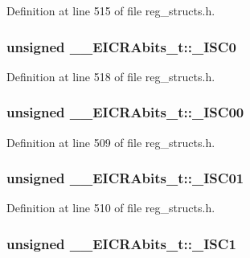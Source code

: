 Definition at line 515 of file reg\+\_\+structs.\+h.

\hypertarget{union_____e_i_c_r_abits__t_a6e8d48b85c5c1f781879076d76f566d0}{
\subsubsection[{\+\_\+\+I\+S\+C0}]{\setlength{\rightskip}{0pt plus 5cm}unsigned \+\_\+\+\_\+\+E\+I\+C\+R\+Abits\+\_\+t\+::\+\_\+\+I\+S\+C0}}\label{union_____e_i_c_r_abits__t_a6e8d48b85c5c1f781879076d76f566d0}


Definition at line 518 of file reg\+\_\+structs.\+h.

\hypertarget{union_____e_i_c_r_abits__t_a29dd9f71cf98c01f86368c683117d9e5}{
\subsubsection[{\+\_\+\+I\+S\+C00}]{\setlength{\rightskip}{0pt plus 5cm}unsigned \+\_\+\+\_\+\+E\+I\+C\+R\+Abits\+\_\+t\+::\+\_\+\+I\+S\+C00}}\label{union_____e_i_c_r_abits__t_a29dd9f71cf98c01f86368c683117d9e5}


Definition at line 509 of file reg\+\_\+structs.\+h.

\hypertarget{union_____e_i_c_r_abits__t_ad23462a0af371238c4837317aa638125}{
\subsubsection[{\+\_\+\+I\+S\+C01}]{\setlength{\rightskip}{0pt plus 5cm}unsigned \+\_\+\+\_\+\+E\+I\+C\+R\+Abits\+\_\+t\+::\+\_\+\+I\+S\+C01}}\label{union_____e_i_c_r_abits__t_ad23462a0af371238c4837317aa638125}


Definition at line 510 of file reg\+\_\+structs.\+h.

\hypertarget{union_____e_i_c_r_abits__t_aaa24d647dc58afefd86e4f0826db2424}{
\subsubsection[{\+\_\+\+I\+S\+C1}]{\setlength{\rightskip}{0pt plus 5cm}unsigned \+\_\+\+\_\+\+E\+I\+C\+R\+Abits\+\_\+t\+::\+\_\+\+I\+S\+C1}}\label{union_____e_i_c_r_abits__t_aaa24d647dc58afefd86e4f0826db2424}


